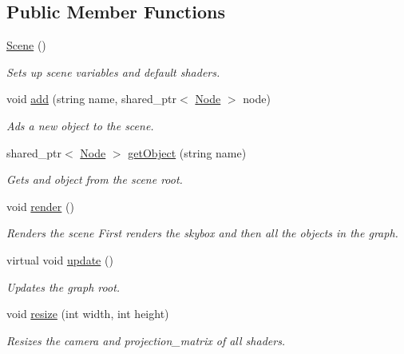 \subsection*{Public Member Functions}
\begin{DoxyCompactItemize}
\item 
\mbox{\hyperlink{classexample_1_1_scene_a70c556631b334b52249e8c3de5dfbdb3}{Scene}} ()
\begin{DoxyCompactList}\small\item\em Sets up scene variables and default shaders. \end{DoxyCompactList}\item 
void \mbox{\hyperlink{classexample_1_1_scene_aad84740d850908b110decaaa3fbd784c}{add}} (string name, shared\+\_\+ptr$<$ \mbox{\hyperlink{classexample_1_1_node}{Node}} $>$ node)
\begin{DoxyCompactList}\small\item\em Ads a new object to the scene. \end{DoxyCompactList}\item 
shared\+\_\+ptr$<$ \mbox{\hyperlink{classexample_1_1_node}{Node}} $>$ \mbox{\hyperlink{classexample_1_1_scene_a8636f5257b9514898b6f57a0161c3169}{get\+Object}} (string name)
\begin{DoxyCompactList}\small\item\em Gets and object from the scene root. \end{DoxyCompactList}\item 
void \mbox{\hyperlink{classexample_1_1_scene_a6e8672b9fab7eaa38bc039467dc0b66a}{render}} ()
\begin{DoxyCompactList}\small\item\em Renders the scene First renders the skybox and then all the objects in the graph. \end{DoxyCompactList}\item 
virtual void \mbox{\hyperlink{classexample_1_1_scene_af0a25c01b0759a02ab7a00364a853b6f}{update}} ()
\begin{DoxyCompactList}\small\item\em Updates the graph root. \end{DoxyCompactList}\item 
void \mbox{\hyperlink{classexample_1_1_scene_a96fdbfc5f6fde59dd1372af8e0ad6bfb}{resize}} (int width, int height)
\begin{DoxyCompactList}\small\item\em Resizes the camera and projection\+\_\+matrix of all shaders. \end{DoxyCompactList}\item 

\end{DoxyCompactItemize}
